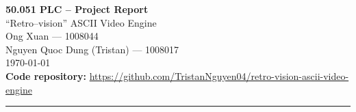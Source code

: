 \documentclass[11pt,a4paper]{article}
\begin{document}
\begin{center}
    {\LARGE\bfseries 50.051 PLC – Project Report}\\[0.3cm]
    {\Large ``Retro–vision'' ASCII Video Engine}\\[0.5cm]
    {\large Ong Xuan — 1008044}\\
    {\large Nguyen Quoc Dung (Tristan) — 1008017}\\[0.3cm]
    {\large\today}\\[0.5cm]

    \small \textbf{Code repository:} 
    \url{https://github.com/TristanNguyen04/retro-vision-ascii-video-engine}
\end{center}

\vspace{0.5cm}
\hrule
\vspace{0.5cm}
\tableofcontents
\newpage








% 
% 
\end{document}

